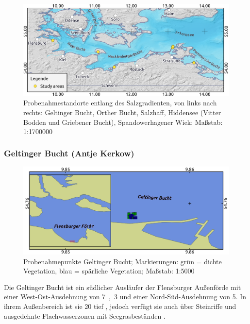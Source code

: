 \begin{figure}[htb]
\centering
\includegraphics[width=1\textwidth]{images/Uebersicht}
\caption[Übersichtskarte der Probenahmestandorte entlang des Salzgradienten]{Probenahmestandorte entlang des Salzgradienten, von links nach rechts: Geltinger Bucht, Orther Bucht, Salzhaff, Hiddensee (Vitter Bodden und Griebener Bucht), Spandowerhagener Wiek; Maßstab: 1:1700000}
\label{Uebersicht}
\end{figure}




\subsubsection{Geltinger Bucht (Antje Kerkow)}


\begin{figure}[htb]
\centering
\includegraphics[width=1\textwidth]{images/GB}
\caption[Probenahmepunkte Geltinger Bucht]{Probenahmepunkte Geltinger Bucht; Markierungen: grün = dichte Vegetation, blau = spärliche Vegetation; Maßstab: 1:5000}
\label{GB}
\end{figure}


Die Geltinger Bucht ist ein südlicher Ausläufer der Flensburger Außenförde mit einer West-Ost-Ausdehnung von \unit{7,3}{\kilo\metre} und einer Nord-Süd-Ausdehnung von \unit{5}{\kilo\metre}. In ihrem Außenbereich ist sie \unit{20}{\metre} tief \citep{nikulina_2009}, jedoch verfügt sie auch über Steinriffe und ausgedehnte Flachwasserzonen mit Seegrasbeständen \citep{landesbetrieb_fur_kustenschutz_nationalpark_und_meeresschutz_schleswig-holstein_2013}.

